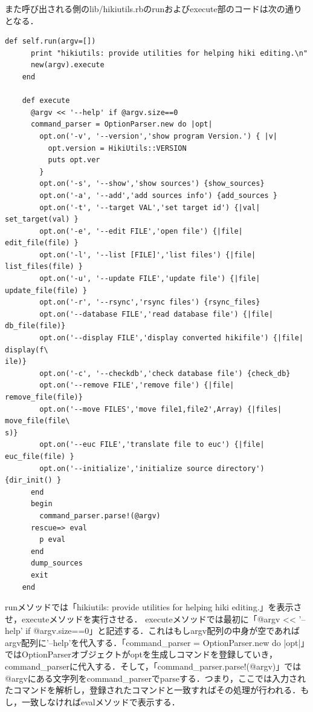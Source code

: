 また呼び出される側のlib/hikiutils.rbのrunおよびexecute部のコードは次の通りとなる．
\begin{lstlisting}[style=customRuby,basicstyle={\scriptsize\ttfamily}]
    def self.run(argv=[])
      print "hikiutils: provide utilities for helping hiki editing.\n"
      new(argv).execute
    end

    def execute
      @argv << '--help' if @argv.size==0
      command_parser = OptionParser.new do |opt|
        opt.on('-v', '--version','show program Version.') { |v|
          opt.version = HikiUtils::VERSION
          puts opt.ver
        }
        opt.on('-s', '--show','show sources') {show_sources}
        opt.on('-a', '--add','add sources info') {add_sources }
        opt.on('-t', '--target VAL','set target id') {|val| set_target(val) }
        opt.on('-e', '--edit FILE','open file') {|file| edit_file(file) }
        opt.on('-l', '--list [FILE]','list files') {|file| list_files(file) }
        opt.on('-u', '--update FILE','update file') {|file| update_file(file) }
        opt.on('-r', '--rsync','rsync files') {rsync_files}
        opt.on('--database FILE','read database file') {|file| db_file(file)}
        opt.on('--display FILE','display converted hikifile') {|file| display(f\
ile)}
        opt.on('-c', '--checkdb','check database file') {check_db}
        opt.on('--remove FILE','remove file') {|file| remove_file(file)}
        opt.on('--move FILES','move file1,file2',Array) {|files| move_file(file\
s)}
        opt.on('--euc FILE','translate file to euc') {|file| euc_file(file) }
        opt.on('--initialize','initialize source directory') {dir_init() }
      end
      begin
        command_parser.parse!(@argv)
      rescue=> eval
        p eval
      end
      dump_sources
      exit
    end  
\end{lstlisting}
runメソッドでは「hikiutils: provide utilities for helping hiki editing.」を表示させ，executeメソッドを実行させる．
executeメソッドでは最初に「@argv << '--help' if @argv.size==0」と記述する．これはもしargv配列の中身が空であればargv配列に'--help'を代入する．「command\_parser = OptionParser.new do |opt|」ではOptionParserオブジェクトがoptを生成しコマンドを登録していき，command\_parserに代入する．そして，「command\_parser.parse!(@argv)」では@argvにある文字列をcommand\_parserでparseする．つまり，ここでは入力されたコマンドを解析し，登録されたコマンドと一致すればその処理が行われる．もし，一致しなければevalメソッドで表示する．

